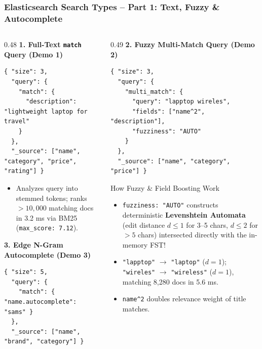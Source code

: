 \documentclass[aspectratio=169]{beamer}
\begin{document}
\begin{frame}[fragile]
\frametitle{Elasticsearch Search Types -- Part 1: Text, Fuzzy \& Autocomplete}
\begin{columns}[T]
\begin{column}{0.48\textwidth}
\textbf{\scriptsize 1. Full-Text \texttt{match} Query (Demo 1)}
\begin{lstlisting}
{ "size": 3,
  "query": {
    "match": {
      "description": "lightweight laptop for travel"
    }
  },
  "_source": ["name", "category", "price", "rating"] }
\end{lstlisting}
\scriptsize
\begin{itemize}
    \item Analyzes query into stemmed tokens; ranks $>10,000$ matching docs in 3.2 ms via BM25 (\texttt{max\_score: 7.12}).
\end{itemize}

\textbf{\scriptsize 3. Edge N-Gram Autocomplete (Demo 3)}
\begin{lstlisting}
{ "size": 5,
  "query": {
    "match": { "name.autocomplete": "sams" }
  },
  "_source": ["name", "brand", "category"] }
\end{lstlisting}
\end{column}
\begin{column}{0.49\textwidth}
\textbf{\scriptsize 2. Fuzzy Multi-Match Query (Demo 2)}
\begin{lstlisting}
{ "size": 3,
  "query": {
    "multi_match": {
      "query": "lapptop wireles",
      "fields": ["name^2", "description"],
      "fuzziness": "AUTO"
    }
  },
  "_source": ["name", "category", "price"] }
\end{lstlisting}
\begin{block}{\scriptsize How Fuzzy \& Field Boosting Work}
\scriptsize
\begin{itemize}
    \item \texttt{fuzziness: "AUTO"} constructs deterministic \textbf{Levenshtein Automata} (edit distance $d \le 1$ for 3--5 chars, $d \le 2$ for $>5$ chars) intersected directly with the in-memory FST!
    \item \texttt{"lapptop"} $\rightarrow$ \texttt{"laptop"} ($d=1$); \texttt{"wireles"} $\rightarrow$ \texttt{"wireless"} ($d=1$), matching 8,280 docs in 5.6 ms.
    \item \texttt{name\string^2} doubles relevance weight of title matches.
\end{itemize}
\end{block}
\end{column}
\end{columns}
\end{frame}
\end{document}

